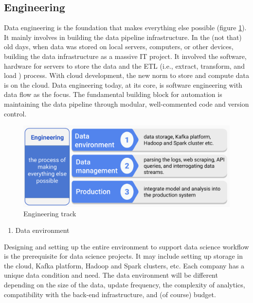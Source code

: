 \documentclass[
  12pt,
]{krantz}
\providecommand{\tightlist}{%
  \setlength{\itemsep}{0pt}\setlength{\parskip}{0pt}}
\begin{document}
\hypertarget{engineering}{%
\subsection{Engineering}\label{engineering}}

Data engineering is the foundation that makes everything else possible (figure \ref{fig:track1engineering}). It mainly involves in building the data pipeline infrastructure. In the (not that) old days, when data was stored on local servers, computers, or other devices, building the data infrastructure as a massive IT project. It involved the software, hardware for servers to store the data and the ETL  (i.e., extract, transform, and load ) process. With cloud development, the new norm to store and compute data is on the cloud. Data engineering today, at its core, is software engineering with data flow as the focus. The fundamental building block for automation is maintaining the data pipeline through modular, well-commented code and version control.

\begin{figure}

{\centering \includegraphics[width=0.8\linewidth]{images/track1_engineering} 

}

\caption{Engineering track}\label{fig:track1engineering}
\end{figure}

\begin{enumerate}
\def\labelenumi{(\arabic{enumi})}
\tightlist
\item
  Data environment
\end{enumerate}

Designing and setting up the entire environment to support data science workflow is the prerequisite for data science projects. It may include setting up storage in the cloud, Kafka  platform, Hadoop  and Spark  clusters, etc. Each company has a unique data condition and need. The data environment will be different depending on the size of the data, update frequency, the complexity of analytics, compatibility with the back-end infrastructure, and (of course) budget.
\end{document}
